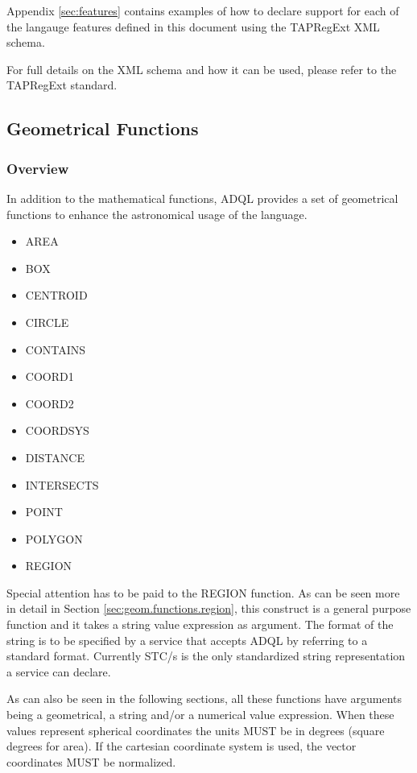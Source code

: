 \documentclass[11pt,a4paper]{ivoa}
\begin{document}
Appendix \ref{sec:features} contains examples of how to declare support
for each of the langauge features defined in this document using the
TAPRegExt XML schema.

For full details on the XML schema and how it can be used, please refer to
the TAPRegExt \citep{std:TAPREGEXT} standard.

\subsection{Geometrical Functions}
\label{sec:geom.functions}
\subsubsection{Overview}
\label{sec:geom.functions.overview}

In addition to the mathematical functions, ADQL provides a set of geometrical
functions to enhance the astronomical usage of the language.

\begin{itemize}
    \item AREA
    \item BOX
    \item CENTROID
    \item CIRCLE
    \item CONTAINS
    \item COORD1
    \item COORD2
    \item COORDSYS
    \item DISTANCE
    \item INTERSECTS
    \item POINT
    \item POLYGON
    \item REGION
\end{itemize}

Special attention has to be paid to the REGION function. As can be seen more
in detail in Section \ref{sec:geom.functions.region}, this construct is a general purpose function and
it takes a string value expression as argument. The format of the string is
to be specified by a service that accepts ADQL by referring to a standard
format. Currently STC/s is the only standardized string
representation a service can declare.

As can also be seen in the following sections, all these functions
have arguments being a geometrical, a string and/or a numerical value
expression. When these values represent spherical coordinates the units MUST
be in degrees (square degrees for area). If the cartesian coordinate system
is used, the vector coordinates MUST be normalized.
\end{document}
